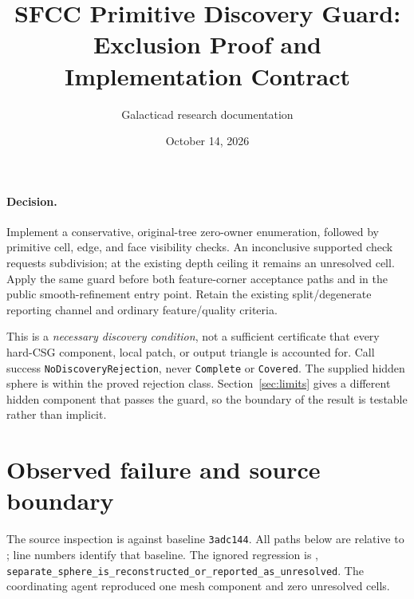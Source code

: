 \documentclass[11pt]{article}
\title{SFCC Primitive Discovery Guard:\\Exclusion Proof and Implementation Contract}
\author{Galacticad research documentation}
\date{October 14, 2026}
\begin{document}
\maketitle

\paragraph{Decision.}
Implement a conservative, original-tree zero-owner enumeration, followed by
primitive cell, edge, and face visibility checks. An inconclusive supported
check requests subdivision; at the existing depth ceiling it remains an
unresolved cell. Apply the same guard before both feature-corner acceptance
paths and in the public smooth-refinement entry point. Retain the existing
split/degenerate reporting channel and ordinary feature/quality criteria.

This is a \emph{necessary discovery condition}, not a sufficient certificate
that every hard-CSG component, local patch, or output triangle is accounted
for. Call success \texttt{NoDiscoveryRejection}, never \texttt{Complete} or
\texttt{Covered}. The supplied hidden sphere is within the proved rejection
class. Section~\ref{sec:limits} gives a different hidden component that passes
the guard, so the boundary of the result is testable rather than implicit.

\section{Observed failure and source boundary}

The source inspection is against baseline \texttt{3adc144}. All paths below are
relative to ; line numbers identify that baseline.
The ignored regression is
,
\texttt{separate\_sphere\_is\_reconstructed\_or\_reported\_as\_unresolved}.
The coordinating agent reproduced one mesh component and zero unresolved cells.
\end{document}
